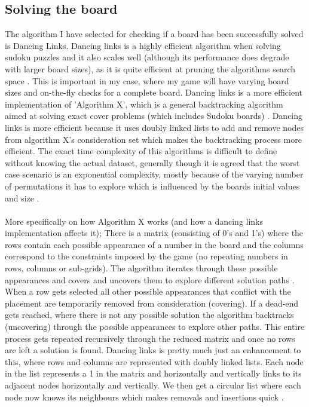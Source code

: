 \documentclass{article}
\begin{document}
\subsection{Solving the board}
The algorithm I have selected for checking if a board has been successfully solved is Dancing Links. Dancing links is a highly efficient algorithm when solving sudoku puzzles and it also scales well (although its performance does degrade with larger board sizes), as it is quite efficient at pruning the algorithms search space \parencite{knuth2000}. This is important in my case, where my game will have varying board sizes and on-the-fly checks for a complete board. Dancing links is a more efficient implementation of 'Algorithm X', which is a general backtracking algorithm aimed at solving exact cover problems (which includes Sudoku boards) \parencite{knuth2000}. Dancing links is more efficient because it uses doubly linked lists to add and remove nodes from algorithm X's consideration set which makes the backtracking process more efficient. The exact time complexity of this algorithms is difficult to define without knowing the actual dataset, generally though it is agreed that the worst case scenario is an exponential complexity, mostly because of the varying number of permutations it has to explore which is influenced by the boards initial values and size \parencite{sedgewick2011}.\\\\
More specifically on how Algorithm X works (and how a dancing links implementation affects it); There is a matrix (consisting of 0's and 1's) where the rows contain each possible appearance of a number in the board and the columns correspond to the constraints imposed by the game (no repeating numbers in rows, columns or sub-grids). The algorithm iterates through these possible appearances and covers and uncovers them to explore different solution paths \parencite{knuth2000}. When a row gets selected all other possible appearances that conflict with the placement are temporarily removed from consideration (covering). If a dead-end gets reached, where there is not any possible solution the algorithm backtracks (uncovering) through the possible appearances to explore other paths. This entire process gets repeated recursively through the reduced matrix and once no rows are left a solution is found. Dancing links is pretty much just an enhancement to this, where rows and columns are represented with doubly linked lists. Each node in the list represents a 1 in the matrix and horizontally and vertically links to its adjacent nodes horizontally and vertically. We then get a circular list where each node now knows its neighbours which makes removals and insertions quick \parencite{knuth2000}.
\end{document}
